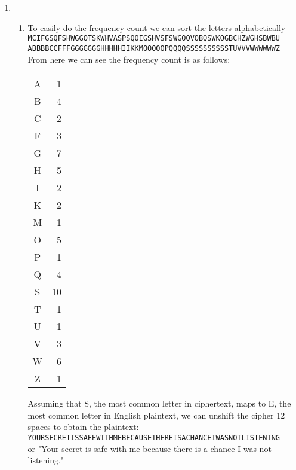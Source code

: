 \documentclass[12pt,letterpaper]{article}
\begin{document}
\begin{enumerate}
    \item
    \begin{enumerate}
    \item
        To easily do the frequency count we can sort the letters alphabetically - \\
        {\tt MCIFGSQFSHWGGOTSKWHVASPSQOIGSHVSFSWGOQVOBQSWKOGBCHZWGHSBWBU}\\
        {\tt ABBBBCCFFFGGGGGGGHHHHHIIKKMOOOOOPQQQQSSSSSSSSSSTUVVVWWWWWWZ}\\
        From here we can see the frequency count is as follows:\\
        \begin{tabular}{cr}
            A &  1 \\
            B &  4 \\
            C &  2 \\
            F &  3 \\
            G &  7 \\
            H &  5 \\
            I &  2 \\
            K &  2 \\
            M &  1 \\
            O &  5 \\
            P &  1 \\
            Q &  4 \\
            S & 10 \\
            T &  1 \\
            U &  1 \\
            V &  3 \\
            W &  6 \\
            Z &  1 \\
        \end{tabular}
        Assuming that S, the most common letter in ciphertext, maps to E, the most common letter in English plaintext, we can unshift the cipher 12 spaces to obtain the plaintext:
        {\tt YOURSECRETISSAFEWITHMEBECAUSETHEREISACHANCEIWASNOTLISTENING}\\
        or "Your secret is safe with me because there is a chance I was not listening."
    \end{enumerate}



\end{enumerate}
\end{document}
